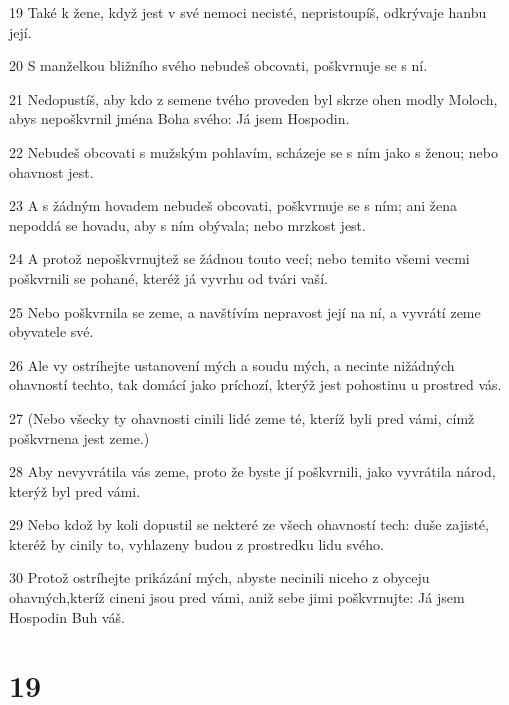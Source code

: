\par 19 Také k žene, když jest v své nemoci necisté, nepristoupíš, odkrývaje hanbu její.
\par 20 S manželkou bližního svého nebudeš obcovati, poškvrnuje se s ní.
\par 21 Nedopustíš, aby kdo z semene tvého proveden byl skrze ohen modly Moloch, abys nepoškvrnil jména Boha svého: Já jsem Hospodin.
\par 22 Nebudeš obcovati s mužským pohlavím, scházeje se s ním jako s ženou; nebo ohavnost jest.
\par 23 A s žádným hovadem nebudeš obcovati, poškvrnuje se s ním; ani žena nepoddá se hovadu, aby s ním obývala; nebo mrzkost jest.
\par 24 A protož nepoškvrnujtež se žádnou touto vecí; nebo temito všemi vecmi poškvrnili se pohané, kteréž já vyvrhu od tvári vaší.
\par 25 Nebo poškvrnila se zeme, a navštívím nepravost její na ní, a vyvrátí zeme obyvatele své.
\par 26 Ale vy ostríhejte ustanovení mých a soudu mých, a necinte nižádných ohavností techto, tak domácí jako príchozí, kterýž jest pohostinu u prostred vás.
\par 27 (Nebo všecky ty ohavnosti cinili lidé zeme té, kteríž byli pred vámi, címž poškvrnena jest zeme.)
\par 28 Aby nevyvrátila vás zeme, proto že byste jí poškvrnili, jako vyvrátila národ, kterýž byl pred vámi.
\par 29 Nebo kdož by koli dopustil se nekteré ze všech ohavností tech: duše zajisté, kteréž by cinily to, vyhlazeny budou z prostredku lidu svého.
\par 30 Protož ostríhejte prikázání mých, abyste necinili niceho z obyceju ohavných,kteríž cineni jsou pred vámi, aniž sebe jimi poškvrnujte: Já jsem Hospodin Buh váš.

\chapter{19}

